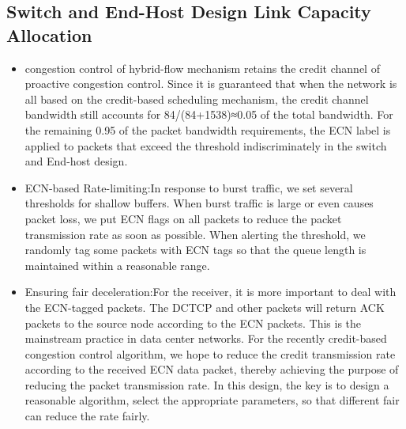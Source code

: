 \documentclass[conference]{IEEEtran}
\begin{document}
\subsection{Switch and End-Host Design Link Capacity Allocation}
\begin{itemize}
\item  congestion control of hybrid-flow mechanism retains the credit channel of proactive congestion control. Since it is guaranteed that when the network is all based on the credit-based scheduling mechanism, the credit channel bandwidth still accounts for 84/(84+1538)≈0.05
    of the total bandwidth. For the remaining 0.95 of the packet bandwidth requirements, the ECN label is applied to packets that exceed the threshold indiscriminately in the switch and End-host design.
\item ECN-based Rate-limiting:In response to burst traffic, we set several thresholds for shallow buffers. When burst traffic is large or even causes packet loss, we put ECN flags on all packets to reduce the packet transmission rate as soon as possible. When alerting the threshold, we randomly tag some packets with ECN tags so that the queue length is maintained within a reasonable range.
\item Ensuring fair deceleration:For the receiver, it is more important to deal with the ECN-tagged packets. The DCTCP and other packets will return ACK packets to the source node according to the ECN packets. This is the mainstream practice in data center networks. For the recently credit-based congestion control algorithm, we hope to reduce the credit transmission rate according to the received ECN data packet, thereby achieving the purpose of reducing the packet transmission rate. In this design, the key is to design a reasonable algorithm, select the appropriate parameters, so that different fair can reduce the rate fairly.
\end{itemize}
\end{document}
